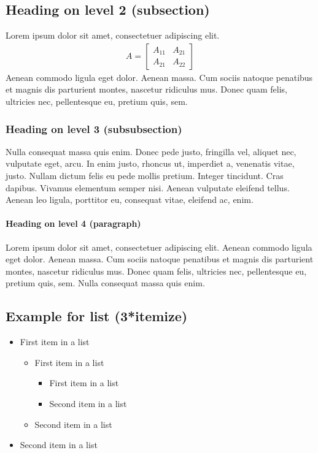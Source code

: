 \documentclass[11pt,english]{article}
\numberwithin{equation}{section}		%
\numberwithin{figure}{section}			%
\numberwithin{table}{section}				%
\begin{document}
\subsection{Heading on level 2 (subsection)}
Lorem ipsum dolor sit amet, consectetuer adipiscing elit. 
\begin{align}
	A = 
	\begin{bmatrix}
	A_{11} & A_{21} \\
  	A_{21} & A_{22}
	\end{bmatrix}
\end{align}
Aenean commodo ligula eget dolor. Aenean massa. Cum sociis natoque penatibus et magnis dis parturient montes, nascetur ridiculus mus. Donec quam felis, ultricies nec, pellentesque eu, pretium quis, sem.

\subsubsection{Heading on level 3 (subsubsection)}
Nulla consequat massa quis enim. Donec pede justo, fringilla vel, aliquet nec, vulputate eget, arcu. In enim justo, rhoncus ut, imperdiet a, venenatis vitae, justo. Nullam dictum felis eu pede mollis pretium. Integer tincidunt. Cras dapibus. Vivamus elementum semper nisi. Aenean vulputate eleifend tellus. Aenean leo ligula, porttitor eu, consequat vitae, eleifend ac, enim.

\paragraph{Heading on level 4 (paragraph)}
Lorem ipsum dolor sit amet, consectetuer adipiscing elit. Aenean commodo ligula eget dolor. Aenean massa. Cum sociis natoque penatibus et magnis dis parturient montes, nascetur ridiculus mus. Donec quam felis, ultricies nec, pellentesque eu, pretium quis, sem. Nulla consequat massa quis enim.

\subsection{Example for list (3*itemize)}
\begin{itemize}
	\item First item in a list 
		\begin{itemize}
		\item First item in a list 
			\begin{itemize}
			\item First item in a list 
			\item Second item in a list 
			\end{itemize}
		\item Second item in a list 
		\end{itemize}
	\item Second item in a list 
\end{itemize}
\end{document}
